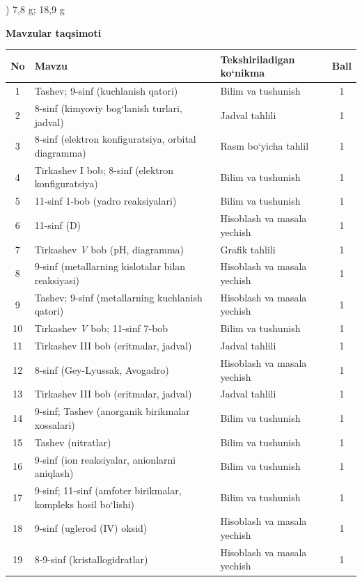 \documentclass[11pt,a4paper]{article}
\begin{document}
) 7,8 g; 18,9 g\par
\par\bigskip\noindent\textbf{Mavzular taqsimoti}\par\smallskip
{\small\noindent\begin{longtable}{|c|p{7.2cm}|p{5.4cm}|c|}\hline \textbf{No} & \textbf{Mavzu} & \textbf{Tekshiriladigan ko`nikma} & \textbf{Ball}\\\hline
1 & Tashev; 9-sinf (kuchlanish qatori) & Bilim va tushunish & 1\\\hline
2 & 8-sinf (kimyoviy bog`lanish turlari, jadval) & Jadval tahlili & 1\\\hline
3 & 8-sinf (elektron konfiguratsiya, orbital diagramma) & Rasm bo`yicha tahlil & 1\\\hline
4 & Tirkashev I bob; 8-sinf (elektron konfiguratsiya) & Bilim va tushunish & 1\\\hline
5 & 11-sinf 1-bob (yadro reaksiyalari) & Bilim va tushunish & 1\\\hline
6 & 11-sinf (D) & Hisoblash va masala yechish & 1\\\hline
7 & Tirkashev \textit{V} bob (pH, diagramma) & Grafik tahlili & 1\\\hline
8 & 9-sinf (metallarning kislotalar bilan reaksiyasi) & Hisoblash va masala yechish & 1\\\hline
9 & Tashev; 9-sinf (metallarning kuchlanish qatori) & Hisoblash va masala yechish & 1\\\hline
10 & Tirkashev \textit{V} bob; 11-sinf 7-bob & Bilim va tushunish & 1\\\hline
11 & Tirkashev III bob (eritmalar, jadval) & Jadval tahlili & 1\\\hline
12 & 8-sinf (Gey-Lyussak, Avogadro) & Hisoblash va masala yechish & 1\\\hline
13 & Tirkashev III bob (eritmalar, jadval) & Jadval tahlili & 1\\\hline
14 & 9-sinf; Tashev (anorganik birikmalar xossalari) & Bilim va tushunish & 1\\\hline
15 & Tashev (nitratlar) & Bilim va tushunish & 1\\\hline
16 & 9-sinf (ion reaksiyalar, anionlarni aniqlash) & Bilim va tushunish & 1\\\hline
17 & 9-sinf; 11-sinf (amfoter birikmalar, kompleks hosil bo`lishi) & Bilim va tushunish & 1\\\hline
18 & 9-sinf (uglerod (IV) oksid) & Hisoblash va masala yechish & 1\\\hline
19 & 8-9-sinf (kristallogidratlar) & Hisoblash va masala yechish & 1\\\hline

\end{longtable}}
\end{document}
